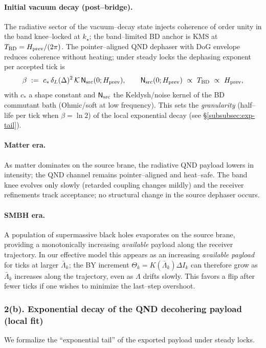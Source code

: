 \documentclass[10pt]{article}
\theoremstyle{definition}
\theoremstyle{plain}
\begin{document}
\paragraph{Initial vacuum decay (post–bridge).} The radiative sector of the vacuum–decay state injects\label{par:uom-main-145}
coherence of order unity in the band knee–locked at $k_\star$; the band–limited BD anchor is KMS at
$T_{\rm BD}=H_{\rm prev}/(2\pi)$. The pointer–aligned QND dephaser with DoG envelope reduces coherence
without heating; under steady locks the dephasing exponent per accepted tick is
\begin{equation}
\label{eq:beta-def}
\beta\ :=\ c_\ast\,\delta_L(\Delta)^2\,\mathcal K\,\mathsf N_{\rm src}(0;H_{\rm prev}),\qquad
\mathsf N_{\rm src}(0;H_{\rm prev})\ \propto\ T_{\rm BD}\ \propto\ H_{\rm prev},
\end{equation}
with $c_\ast$ a shape constant and $\mathsf N_{\rm src}$ the Keldysh/noise kernel of the BD commutant bath
(Ohmic/soft at low frequency). This sets the \emph{granularity} (half–life per tick when $\beta=\ln 2$) of
the local exponential decay (see \S\ref{subsubsec:exp-tail}).

\paragraph{Matter era.} As matter dominates on the source brane, the radiative QND payload lowers in intensity;\label{par:uom-main-146}
the QND channel remains pointer–aligned and heat–safe. The band knee evolves only slowly (retarded coupling changes
mildly) and the receiver refinements track acceptance; no structural change in the source dephaser occurs.

\paragraph{SMBH era.} A population of supermassive black holes evaporates on the source brane, providing a\label{par:uom-main-147}
monotonically increasing \emph{available} payload along the receiver trajectory. In our effective model this appears as an
increasing \emph{available payload} for ticks at larger $\bar\Lambda_k$; the BY increment
$\Theta_k=K(\bar\Lambda_k)\Delta I_k$ can therefore grow as $\bar\Lambda_k$ increases along the trajectory,
even as $\Lambda$ drifts slowly. This favors a
flip after fewer ticks if one wishes to minimize the last–step overshoot.

\subsubsection*{2(b). Exponential decay of the QND decohering payload (local fit)}
\label{subsubsec:exp-tail}
We formalize the “exponential tail” of the exported payload under steady locks.
\end{document}
